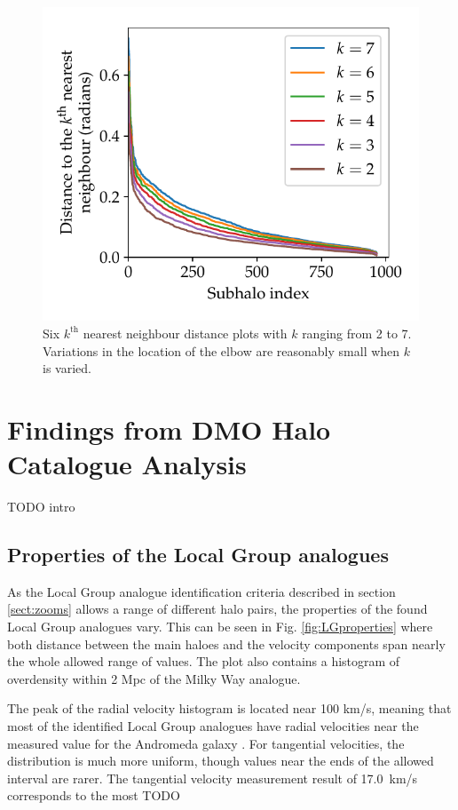 \documentclass[english, oneside]{HYgradu}
\begin{document}
\begin{figure}
    \centering
    \includegraphics{kuvat/k-distances-singlesim.pdf}
    \caption{Six $k^{\text{th}}$ nearest neighbour distance plots with $k$ ranging from 2 to 7. Variations in the location of the elbow are reasonably small when $k$ is varied.}\label{fig:k-distances-singlesim}
\end{figure}


\chapter{Findings from DMO Halo Catalogue Analysis}
TODO intro %

\section{Properties of the Local Group analogues}
As the Local Group analogue identification criteria described in section \ref{sect:zooms} allows a range of different halo pairs, the properties of the found Local Group analogues vary. This can be seen in Fig. \ref{fig:LGproperties} where both distance between the main haloes and the velocity components span nearly the whole allowed range of values. The plot also contains a histogram of overdensity within 2 Mpc of the Milky Way analogue.

The peak of the radial velocity histogram is located near 100 km/s, meaning that most of the identified Local Group analogues have radial velocities near the measured value for the Andromeda galaxy \citep{vandermarel2012m31}. For tangential velocities, the distribution is much more uniform, though values near the ends of the allowed interval are rarer. The \citet{vandermarel2012m31} tangential velocity measurement result of 17.0~km/s corresponds to the most TODO %
\end{document}
